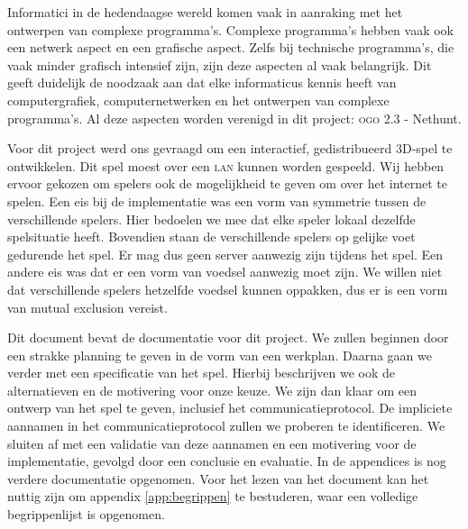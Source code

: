 Informatici in de hedendaagse wereld komen vaak in aanraking met het ontwerpen van complexe programma's. Complexe programma's hebben vaak ook een netwerk aspect en een grafische aspect. Zelfs bij technische programma's, die vaak minder grafisch intensief zijn, zijn deze aspecten al vaak belangrijk. Dit geeft duidelijk de noodzaak aan dat elke informaticus kennis heeft van computergrafiek, computernetwerken en het ontwerpen van complexe programma's. Al deze aspecten worden verenigd in dit project: \textsc{ogo} 2.3 - Nethunt.

Voor dit project werd ons gevraagd om een interactief, gedistribueerd 3D-spel te ontwikkelen. Dit spel moest over een \textsc{lan} kunnen worden gespeeld. Wij hebben ervoor gekozen om spelers ook de mogelijkheid te geven om over het internet te spelen. Een eis bij de implementatie was een vorm van symmetrie tussen de verschillende spelers. Hier bedoelen we mee dat elke speler lokaal dezelfde spelsituatie heeft. Bovendien staan de verschillende spelers op gelijke voet gedurende het spel. Er mag dus geen server aanwezig zijn tijdens het spel. Een andere eis was dat er een vorm van voedsel aanwezig moet zijn. We willen niet dat verschillende spelers hetzelfde voedsel kunnen oppakken, dus er is een vorm van mutual exclusion vereist.

Dit document bevat de documentatie voor dit project. We zullen beginnen door een strakke planning te geven in de vorm van een werkplan. Daarna gaan we verder met een specificatie van het spel. Hierbij beschrijven we ook de alternatieven en de motivering voor onze keuze. We zijn dan klaar om een ontwerp van het spel te geven, inclusief het communicatieprotocol. De impliciete aannamen in het communicatieprotocol zullen we proberen te identificeren. We sluiten af met een validatie van deze aannamen en een motivering voor de implementatie, gevolgd door een conclusie en evaluatie. In de appendices is nog verdere documentatie opgenomen. Voor het lezen van het document kan het nuttig zijn om appendix \ref{app:begrippen} te bestuderen, waar een volledige begrippenlijst is opgenomen. 
